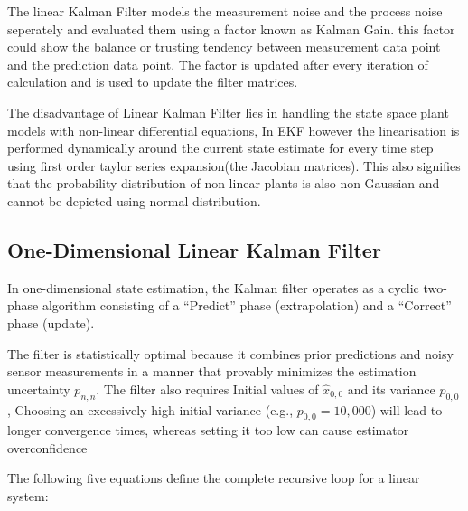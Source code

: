 The linear Kalman Filter models the measurement noise and the process noise seperately and evaluated them using a factor known as Kalman Gain. this factor could show the balance or trusting tendency between measurement data point and the prediction data point. The factor is updated after every iteration of calculation and is used to update the filter matrices.

The disadvantage of Linear Kalman Filter lies in handling the state space plant models with non-linear differential equations, In EKF however the linearisation is performed dynamically around the current state estimate for every time step using first order taylor series expansion(the Jacobian matrices). This also signifies that the probability distribution of non-linear plants is also non-Gaussian and cannot be depicted using normal distribution. 

\subsection{One-Dimensional Linear Kalman Filter}
\label{sec:kalman_filter_1d}

In one-dimensional state estimation, the Kalman filter operates as a cyclic two-phase algorithm consisting of a \enquote{Predict} phase (extrapolation) and a \enquote{Correct} phase (update).%

The filter is statistically optimal because it combines prior predictions and noisy sensor measurements in a manner that provably minimizes the estimation uncertainty $p_{n,n}$. The filter also requires Initial values of $\hat{x}_{0,0}$ and its variance $p_{0,0}$, Choosing an excessively high initial variance (e.g., $p_{0,0}=10{,}000$) will lead to longer convergence times, whereas setting it too low can cause estimator overconfidence

The following five equations define the complete recursive loop for a linear system:

